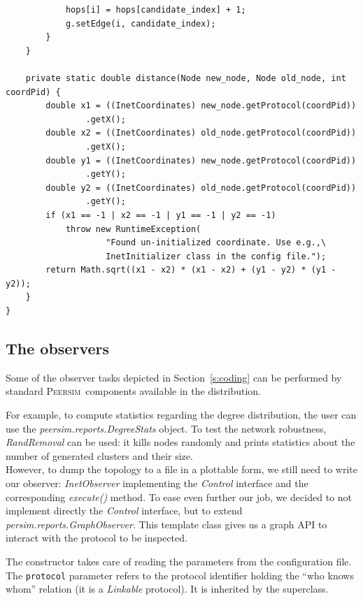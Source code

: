 \documentclass[a4paper,11pt]{article}
\newcommand{\id}[1]{{\scshape\small #1}}
\newcommand{\psim}{\id{Peersim}}
\begin{document}
\begin{verbatim}
            hops[i] = hops[candidate_index] + 1;
            g.setEdge(i, candidate_index);
        }
    }

    private static double distance(Node new_node, Node old_node, int coordPid) {
        double x1 = ((InetCoordinates) new_node.getProtocol(coordPid))
                .getX();
        double x2 = ((InetCoordinates) old_node.getProtocol(coordPid))
                .getX();
        double y1 = ((InetCoordinates) new_node.getProtocol(coordPid))
                .getY();
        double y2 = ((InetCoordinates) old_node.getProtocol(coordPid))
                .getY();
        if (x1 == -1 | x2 == -1 | y1 == -1 | y2 == -1)
            throw new RuntimeException(
                    "Found un-initialized coordinate. Use e.g.,\
                    InetInitializer class in the config file.");
        return Math.sqrt((x1 - x2) * (x1 - x2) + (y1 - y2) * (y1 - y2));
    }
}
\end{verbatim}
\normalsize
     
\subsection{The observers}
\label{s:observers}

Some of the observer tasks depicted in Section~\ref{s:coding} can be performed
by standard \psim~components available in the distribution. 

For example, to compute statistics regarding the degree distribution, the user can
use the \emph{peersim.reports.DegreeStats} object. To test the network
robustness, \emph{RandRemoval} can be used: it kills nodes randomly
and prints statistics about the number of generated clusters and their
size.\\

However, to dump the topology to a file in a plottable form, we still
need to write our observer: \emph{InetObserver} implementing the \emph{Control}
interface and the corresponding 
\emph{execute()} method. To ease even further our job, we decided to
not implement directly the \emph{Control} interface, but to extend
\emph{persim.reports.GraphObserver}. This template class gives us a
graph API to interact with the protocol to be inspected.

The constructor takes care of reading the parameters from the
configuration file. The \texttt{protocol} parameter refers to the
protocol identifier holding the ``who knows whom'' relation (it is a
\emph{Linkable} protocol). It is inherited by the superclass.
\end{document}
